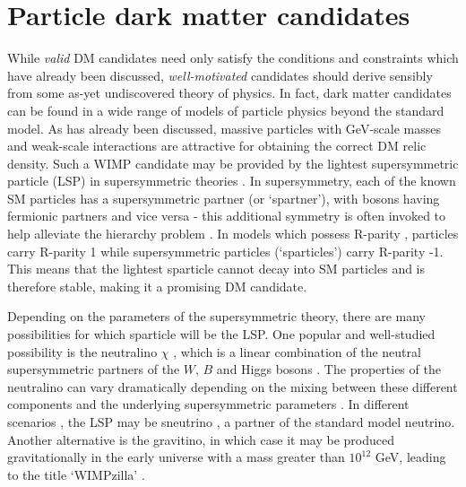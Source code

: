 \section{Particle dark matter candidates}
\label{intro:sec:candidates}


While \textit{valid} DM candidates need only satisfy the conditions and constraints which have already been discussed, \textit{well-motivated} candidates should derive sensibly from some as-yet undiscovered theory of physics. In fact, dark matter candidates can be found in a wide range of models of particle physics beyond the standard model. As has already been discussed, massive particles with GeV-scale masses and weak-scale interactions are attractive for obtaining the correct DM relic density. Such a WIMP candidate may be provided by the lightest supersymmetric particle (LSP) in supersymmetric theories \cite{Jungman:1995}. In supersymmetry, each of the known SM particles has a supersymmetric partner (or `spartner'), with bosons having fermionic partners and vice versa - this additional symmetry is often invoked to help alleviate the hierarchy problem \cite{Kane:2011}. In models which possess R-parity , particles carry R-parity 1 while supersymmetric particles (`sparticles') carry R-parity -1. This means that the lightest sparticle cannot decay into SM particles and is therefore stable, making it a promising DM candidate. 


Depending on the parameters of the supersymmetric theory, there are many possibilities for which sparticle will be the LSP. One popular and well-studied possibility is the neutralino $\chi$ \cite{Ellis:1984,OTHERS}, which is a linear combination of the neutral supersymmetric partners of the $W$, $B$ and Higgs bosons . The properties of the neutralino can vary dramatically depending on the mixing between these different components and the underlying supersymmetric parameters \cite{Shakya:2013} .  In different scenarios , the LSP may be sneutrino \cite{Choi:2013}, a partner of the standard model neutrino.  Another alternative is the gravitino, in which case it may be produced gravitationally in the early universe with a mass greater than $10^{12}$ GeV, leading to the title `WIMPzilla' \cite{Kolb:1998}.

